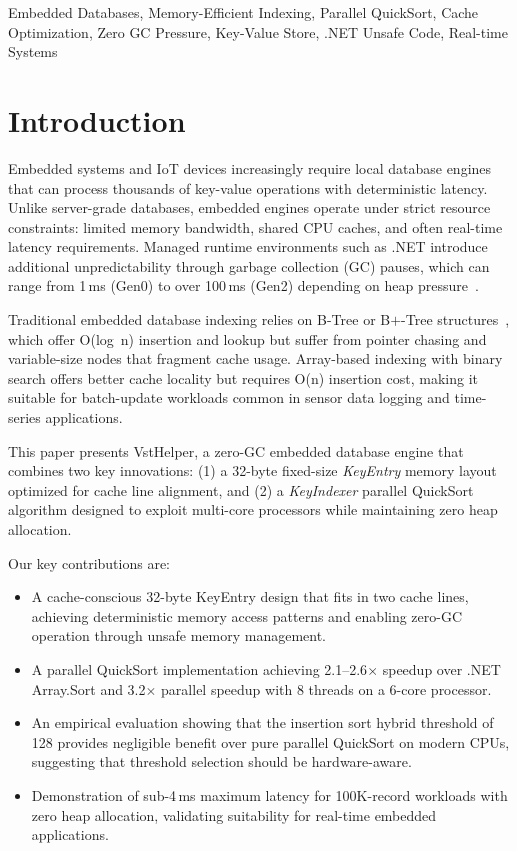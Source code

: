 \documentclass[conference]{IEEEtran}
\begin{document}
\begin{IEEEkeywords}
Embedded Databases, Memory-Efficient Indexing, Parallel QuickSort, Cache Optimization, Zero GC Pressure, Key-Value Store, .NET Unsafe Code, Real-time Systems
\end{IEEEkeywords}

\section{Introduction}
\label{sec:introduction}

Embedded systems and IoT devices increasingly require local database engines that can process thousands of key-value operations with deterministic latency. Unlike server-grade databases, embedded engines operate under strict resource constraints: limited memory bandwidth, shared CPU caches, and often real-time latency requirements. Managed runtime environments such as .NET introduce additional unpredictability through garbage collection (GC) pauses, which can range from 1\,ms (Gen0) to over 100\,ms (Gen2) depending on heap pressure~\cite{maeda2012memory}.

Traditional embedded database indexing relies on B-Tree or B$+$-Tree structures~\cite{lamarca1999cache}, which offer O(log~n) insertion and lookup but suffer from pointer chasing and variable-size nodes that fragment cache usage. Array-based indexing with binary search offers better cache locality but requires O(n) insertion cost, making it suitable for batch-update workloads common in sensor data logging and time-series applications.

This paper presents VstHelper, a zero-GC embedded database engine that combines two key innovations: (1) a 32-byte fixed-size \textit{KeyEntry} memory layout optimized for cache line alignment, and (2) a \textit{KeyIndexer} parallel QuickSort algorithm designed to exploit multi-core processors while maintaining zero heap allocation.

Our key contributions are:
\begin{itemize}
    \item A cache-conscious 32-byte KeyEntry design that fits in two cache lines, achieving deterministic memory access patterns and enabling zero-GC operation through unsafe memory management.
    \item A parallel QuickSort implementation achieving 2.1--2.6$\times$ speedup over .NET Array.Sort and 3.2$\times$ parallel speedup with 8 threads on a 6-core processor.
    \item An empirical evaluation showing that the insertion sort hybrid threshold of 128 provides negligible benefit over pure parallel QuickSort on modern CPUs, suggesting that threshold selection should be hardware-aware.
    \item Demonstration of sub-4\,ms maximum latency for 100K-record workloads with zero heap allocation, validating suitability for real-time embedded applications.
\end{itemize}
\end{document}
